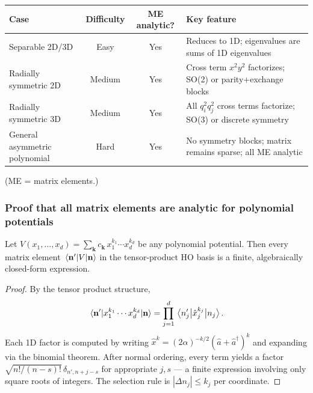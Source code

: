 \begin{center}
\renewcommand{\arraystretch}{1.4}
\begin{tabular}{p{4.2cm}ccp{5.2cm}}
\toprule
Case & Difficulty & ME analytic? & Key feature \\
\midrule
Separable 2D/3D & Easy & Yes &
  Reduces to 1D; eigenvalues are sums of 1D eigenvalues \\
Radially symmetric 2D & Medium & Yes &
  Cross term $x^2y^2$ factorizes; SO(2) or parity+exchange blocks \\
Radially symmetric 3D & Medium & Yes &
  All $q_i^2 q_j^2$ cross terms factorize; SO(3) or discrete symmetry \\
General asymmetric polynomial & Hard & Yes &
  No symmetry blocks; matrix remains sparse; all ME analytic \\
\bottomrule
\end{tabular}
\end{center}

(ME = matrix elements.)

\subsubsection{Proof that all matrix elements are analytic for polynomial
potentials}

\begin{result}\label{res:analytic_me}
Let $V(x_1, \dots, x_d) = \sum_{\mathbf{k}} c_\mathbf{k}\,
x_1^{k_1} \cdots x_d^{k_d}$ be any polynomial potential.
Then every matrix element $\mel{\mathbf{n}'}{V}{\mathbf{n}}$ in the
tensor-product HO basis is a finite, algebraically closed-form expression.
\end{result}

\begin{proof}
By the tensor product structure,
\begin{equation}\label{eq:poly_factorize}
    \mel{\mathbf{n}'}{x_1^{k_1}\cdots x_d^{k_d}}{\mathbf{n}}
    = \prod_{j=1}^{d} \mel{n'_j}{\hat{x}_j^{k_j}}{n_j}.
\end{equation}
Each 1D factor is computed by writing
$\hat{x}^k = (2\alpha)^{-k/2}(\hat{a} + \hat{a}^\dagger)^k$
and expanding via the binomial theorem.  After normal ordering, every term
yields a factor $\sqrt{n!/(n-s)!}\,\delta_{n',n+j-s}$ for appropriate
$j,s$ --- a finite expression involving only square roots of integers.
The selection rule is $|\Delta n_j| \leq k_j$ per coordinate.
\end{proof}

